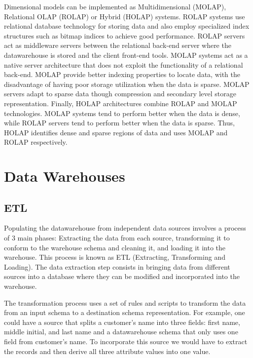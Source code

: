 \documentclass[]{article}
\begin{document}
Dimensional models can be implemented as Multidimensional (MOLAP), Relational OLAP (ROLAP) or Hybrid (HOLAP) systems. ROLAP systems use
relational database technology for storing data and also employ specialized index structures such as bitmap indices to achieve good
performance. ROLAP servers act as middleware servers between the relational back-end server where the datawarehouse is stored and the
client front-end tools. MOLAP systems act as a native server architecture that does not exploit the functionality of a relational
back-end. MOLAP provide better indexing properties to locate data, with the disadvantage of having poor storage utilization when the
data is sparse. MOLAP servers adapt to sparse data though compression and secondary level storage representation. Finally, HOLAP
architectures combine ROLAP and MOLAP technologies. MOLAP systems tend to perform better when the data is dense, while ROLAP servers
tend to perform better when the data is sparse. Thus, HOLAP identifies dense and sparse regions of data and uses MOLAP and ROLAP
respectively.



\section{Data Warehouses} %
\label{sec:data_warehouses}

\subsection{ETL} %
\label{sub:etl}
Populating the datawarehouse from independent data sources involves a process of 3 main phases: Extracting the data from each source,
transforming it to conform to the warehouse schema and cleaning it, and loading it into the warehouse. This process is known as ETL
(Extracting, Transforming and Loading).
The data extraction step consists in bringing data from different sources into a database where they can be modified and incorporated
into the warehouse.

The transformation process uses a set of rules and scripts to transform the data from an input schema to a destination schema
representation. For example, one could have a source that splits a customer's name into three fields: first name, middle initial, and
last name and a datawarehouse schema that only uses one field from customer's name. To incorporate this source we would have to extract
the records and then derive all three attribute values into one value. 
\end{document}
